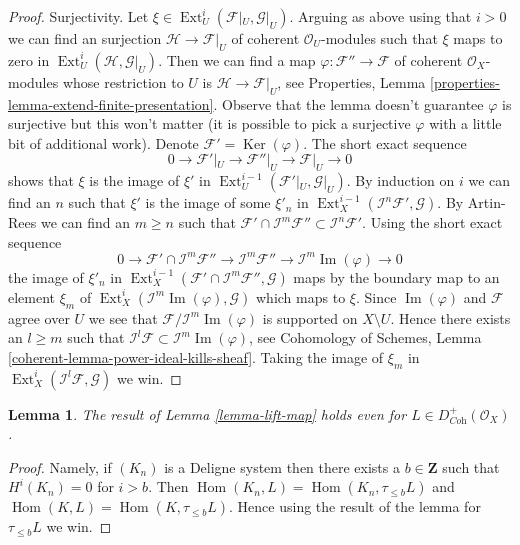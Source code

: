 \documentclass{stacks-project}
\theoremstyle{plain}
\newtheorem{lemma}[subsection]{Lemma}
\theoremstyle{definition}
\theoremstyle{remark}
\numberwithin{equation}{subsection}
\def\Hom{\mathop{\mathrm{Hom}}\nolimits}
\def\Ext{\mathop{\mathrm{Ext}}\nolimits}
\def\Ker{\mathop{\mathrm{Ker}}}
\def\Im{\mathop{\mathrm{Im}}}
\begin{document}
\begin{proof}
\medskip\noindent
Surjectivity. Let $\xi \in \Ext^i_U(\mathcal{F}|_U, \mathcal{G}|_U)$.
Arguing as above using that $i > 0$ we can find an surjection
$\mathcal{H} \to \mathcal{F}|_U$ of coherent $\mathcal{O}_U$-modules
such that $\xi$ maps to zero in $\Ext^i_U(\mathcal{H}, \mathcal{G}|_U)$.
Then we can find a map $\varphi : \mathcal{F}'' \to \mathcal{F}$
of coherent $\mathcal{O}_X$-modules whose restriction to $U$ is
$\mathcal{H} \to \mathcal{F}|_U$, see
Properties, Lemma \ref{properties-lemma-extend-finite-presentation}.
Observe that the lemma doesn't guarantee $\varphi$ is surjective
but this won't matter (it is possible to pick a surjective $\varphi$
with a little bit of additional work).
Denote $\mathcal{F}' = \Ker(\varphi)$. The short exact sequence
$$
0 \to \mathcal{F}'|_U \to \mathcal{F}''|_U \to \mathcal{F}|_U \to 0
$$
shows that $\xi$ is the image of $\xi'$ in
$\Ext^{i - 1}_U(\mathcal{F}'|_U, \mathcal{G}|_U)$.
By induction on $i$ we can find an $n$ such that
$\xi'$ is the image of some $\xi'_n$ in
$\Ext^{i - 1}_X(\mathcal{I}^n\mathcal{F}', \mathcal{G})$.
By Artin-Rees we can find an $m \geq n$ such that
$\mathcal{F}' \cap \mathcal{I}^m\mathcal{F}'' \subset
\mathcal{I}^n\mathcal{F}'$. Using the short exact sequence
$$
0 \to \mathcal{F}' \cap \mathcal{I}^m\mathcal{F}'' \to
\mathcal{I}^m\mathcal{F}'' \to \mathcal{I}^m\Im(\varphi) \to 0
$$
the image of $\xi'_n$ in
$\Ext^{i - 1}_X(\mathcal{F}' \cap \mathcal{I}^m\mathcal{F}'', \mathcal{G})$
maps by the boundary map to an element $\xi_m$ of
$\Ext^i_X(\mathcal{I}^m\Im(\varphi), \mathcal{G})$ which maps
to $\xi$. Since $\Im(\varphi)$ and $\mathcal{F}$ agree over $U$
we see that $\mathcal{F}/\mathcal{I}^m\Im(\varphi)$ is supported
on $X \setminus U$. Hence there exists an $l \geq m$
such that $\mathcal{I}^l\mathcal{F} \subset \mathcal{I}^m\Im(\varphi)$, see
Cohomology of Schemes, Lemma \ref{coherent-lemma-power-ideal-kills-sheaf}.
Taking the image of $\xi_m$ in
$\Ext^i_X(\mathcal{I}^l\mathcal{F}, \mathcal{G})$ we win.
\end{proof}

\begin{lemma}
\label{lemma-lift-map-plus}
The result of Lemma \ref{lemma-lift-map} holds even for
$L \in D^+_{\textit{Coh}}(\mathcal{O}_X)$.
\end{lemma}

\begin{proof}
Namely, if $(K_n)$ is a Deligne system then there exists a
$b \in \mathbf{Z}$ such that $H^i(K_n) = 0$ for $i > b$.
Then $\Hom(K_n, L) = \Hom(K_n, \tau_{\leq b}L)$ and
$\Hom(K, L) = \Hom(K, \tau_{\leq b}L)$. Hence using
the result of the lemma for $\tau_{\leq b}L$ we win.
\end{proof}
\end{document}
